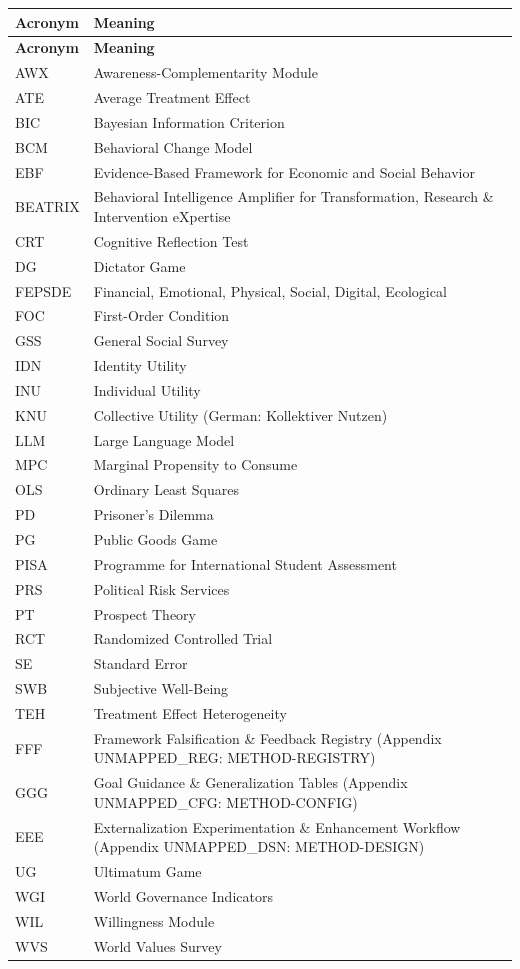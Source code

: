 \begin{center}
\renewcommand{\arraystretch}{1.2}
\begin{longtable}{lp{10cm}}
\hline
\textbf{Acronym} & \textbf{Meaning} \\
\hline
\endfirsthead
\hline
\textbf{Acronym} & \textbf{Meaning} \\
\hline
\endhead
\hline
\endfoot

AWX & Awareness-Complementarity Module \\
ATE & Average Treatment Effect \\
BIC & Bayesian Information Criterion \\
BCM & Behavioral Change Model \\
EBF & Evidence-Based Framework for Economic and Social Behavior \\
BEATRIX & Behavioral Intelligence Amplifier for Transformation, Research \& Intervention eXpertise \\
CRT & Cognitive Reflection Test \\
DG & Dictator Game \\
FEPSDE & Financial, Emotional, Physical, Social, Digital, Ecological \\
FOC & First-Order Condition \\
GSS & General Social Survey \\
IDN & Identity Utility \\
INU & Individual Utility \\
KNU & Collective Utility (German: Kollektiver Nutzen) \\
LLM & Large Language Model \\
MPC & Marginal Propensity to Consume \\
OLS & Ordinary Least Squares \\
PD & Prisoner's Dilemma \\
PG & Public Goods Game \\
PISA & Programme for International Student Assessment \\
PRS & Political Risk Services \\
PT & Prospect Theory \\
RCT & Randomized Controlled Trial \\
SE & Standard Error \\
SWB & Subjective Well-Being \\
TEH & Treatment Effect Heterogeneity \\
FFF & Framework Falsification \& Feedback Registry (Appendix UNMAPPED_REG: METHOD-REGISTRY) \\
GGG & Goal Guidance \& Generalization Tables (Appendix UNMAPPED_CFG: METHOD-CONFIG) \\
EEE & Externalization Experimentation \& Enhancement Workflow (Appendix UNMAPPED_DSN: METHOD-DESIGN) \\
UG & Ultimatum Game \\
WGI & World Governance Indicators \\
WIL & Willingness Module \\
WVS & World Values Survey \\
\hline

\end{longtable}
\end{center}


